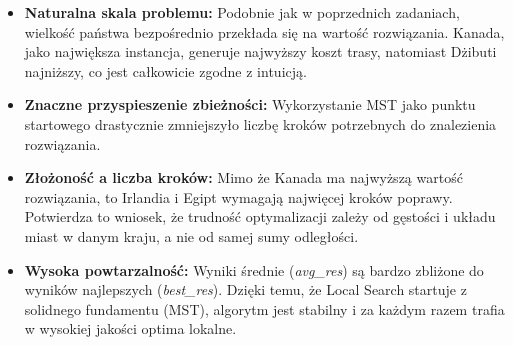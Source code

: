 \documentclass{article}
\begin{document}
\begin{itemize}
    \item \textbf{Naturalna skala problemu:} Podobnie jak w poprzednich zadaniach, wielkość państwa bezpośrednio przekłada się na wartość rozwiązania. Kanada, jako największa instancja, generuje najwyższy koszt trasy, natomiast Dżibuti najniższy, co jest całkowicie zgodne z intuicją.
    
    \item \textbf{Znaczne przyspieszenie zbieżności:} Wykorzystanie MST jako punktu startowego drastycznie zmniejszyło liczbę kroków potrzebnych do znalezienia rozwiązania. 
    
    \item \textbf{Złożoność a liczba kroków:} Mimo że Kanada ma najwyższą wartość rozwiązania, to Irlandia i Egipt wymagają najwięcej kroków poprawy. Potwierdza to wniosek, że trudność optymalizacji zależy od gęstości i układu miast w danym kraju, a nie od samej sumy odległości.
    
    \item \textbf{Wysoka powtarzalność:} Wyniki średnie (\textit{avg\_res}) są bardzo zbliżone do wyników najlepszych (\textit{best\_res}). Dzięki temu, że Local Search startuje z solidnego fundamentu (MST), algorytm jest stabilny i za każdym razem trafia w wysokiej jakości optima lokalne.
\end{itemize}
\end{document}

